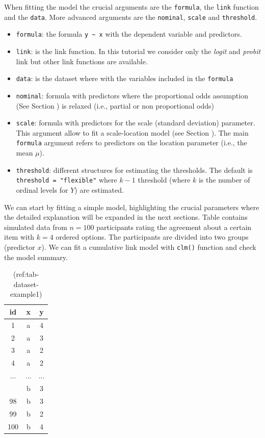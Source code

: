 \documentclass[
  man,floatsintext]{apa6}
\providecommand{\tightlist}{%
  \setlength{\itemsep}{0pt}\setlength{\parskip}{0pt}}
\begin{document}
When fitting the model the crucial arguments are the \texttt{formula}, the \texttt{link} function and the \texttt{data}. More advanced arguments are the \texttt{nominal}, \texttt{scale} and \texttt{threshold}.

\begin{itemize}
\tightlist
\item
  \texttt{formula}: the formula \texttt{y\ \textasciitilde{}\ x} with the dependent variable and predictors.
\item
  \texttt{link}: is the link function. In this tutorial we consider only the \emph{logit} and \emph{probit} link but other link functions are available.
\item
  \texttt{data}: is the dataset where with the variables included in the \texttt{formula}
\item
  \texttt{nominal}: formula with predictors where the proportional odds assumption (See Section ) is relaxed (i.e., partial or non proportional odds)
\item
  \texttt{scale}: formula with predictors for the scale (standard deviation) parameter. This argument allow to fit a scale-location model (see Section ). The main \texttt{formula} argument refers to predictors on the location parameter (i.e., the mean \(\mu\)).
\item
  \texttt{threshold}: different structures for estimating the thresholds. The default is \texttt{threshold\ =\ "flexible"} where \(k - 1\) threshold (where \(k\) is the number of ordinal levels for \(Y\)) are estimated.
\end{itemize}

We can start by fitting a simple model, highlighting the crucial parameters where the detailed explanation will be expanded in the next sections. Table contains simulated data from \(n = 100\) participants rating the agreement about a certain item with \(k = 4\) ordered options. The participants are divided into two groups (predictor \(x\)). We can fit a cumulative link model with \texttt{clm()} function and check the model summary.

\scriptsize

\begin{table}

\caption{\label{tab:tab-dataset-example1}(ref:tab-dataset-example1)}
\centering
\begin{tabular}[t]{ccc}
\toprule
id & x & y\\
\midrule
1 & a & 4\\
2 & a & 3\\
3 & a & 2\\
4 & a & 2\\
... & ... & ...\\
\addlinespace
97 & b & 3\\
98 & b & 3\\
99 & b & 2\\
100 & b & 4\\
\bottomrule
\end{tabular}
\end{table}
\end{document}
